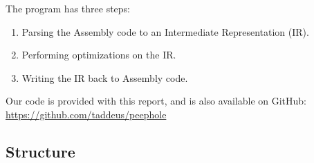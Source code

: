 \documentclass[10pt,a4paper]{article}
\begin{document}
The program has three steps:
\begin{enumerate}
    \item Parsing the Assembly code to an Intermediate Representation (IR).
    \item Performing optimizations on the IR.
    \item Writing the IR back to Assembly code.
\end{enumerate}

Our code is provided with this report, and is also available on GitHub: \\
\url{https://github.com/taddeus/peephole}

\subsection{Structure}
\end{document}
